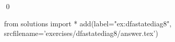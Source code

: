 
\begin{ex} 
  \label{ex:dfastatediag8}
  
  \qed
\end{ex} 
\begin{python0}
from solutions import *
add(label="ex:dfastatediag8",
    srcfilename='exercises/dfastatediag8/answer.tex') 
\end{python0}
